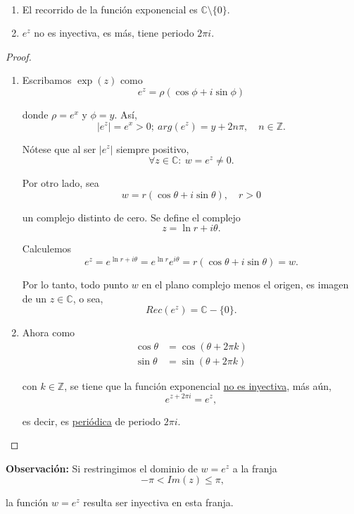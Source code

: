 \newpage
\begin{propo}
\ 

\begin{enumerate}
    \item El recorrido de la función exponencial es $\mathbb{C} \setminus \{0\}$.
    
    \item $e^z$ no es inyectiva, es más, tiene periodo $2\pi i$.
\end{enumerate}
\end{propo}

\begin{proof}
\ 

\begin{enumerate}
    \item Escribamos $\exp(z)$ como 
$$e^z = \rho(\cos\phi + i \sin\phi)$$

donde $\rho = e^x$ y $\phi = y$. Así, 
$$|e^z| = e^x > 0; ~ arg(e^z) = y + 2n\pi, \quad n \in \mathbb{Z}.$$

Nótese que al ser $|e^z|$ siempre positivo, 
$$\forall z \in \mathbb{C}: ~w = e^z \neq 0.$$

Por otro lado, sea
$$w = r (\cos\theta + i \sin \theta), \quad r >0$$

un complejo distinto de cero. Se define el complejo 
$$z = \ln r + i\theta.$$

Calculemos 
$$e^z = e^{\ln r + i\theta} = e^{\ln r} e^{i\theta} = r (\cos \theta + i\sin\theta) = w.$$

Por lo tanto, todo punto $w$ en el plano complejo menos el origen, es imagen de un $z \in \mathbb{C}$, o sea,
$$Rec(e^z) = \mathbb{C} - \{0\}.$$

\item Ahora como 
\begin{align*}
\cos\theta &= \cos(\theta + 2\pi k ) \\
\sin\theta &= \sin(\theta + 2\pi k)
\end{align*}

con $k \in \mathbb{Z}$, se tiene que la función exponencial \underline{no es inyectiva}, más aún,
$$e^{z + 2\pi i} = e^z,$$

es decir, es \underline{periódica} de periodo $2\pi i$.
\end{enumerate}
\end{proof}

\textbf{Observación:} Si restringimos el dominio de $w = e^z$ a la franja
$$-\pi < Im(z) \leq \pi,$$

la función $w = e^z$ resulta ser inyectiva en esta franja.

